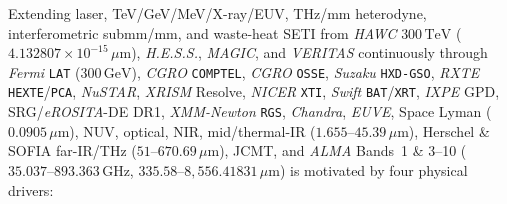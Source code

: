 \documentclass[twocolumn,10pt]{article}
\begin{document}
Extending laser, TeV/GeV/MeV/X-ray/EUV, THz/mm heterodyne, interferometric submm/mm, and waste-heat SETI from \textit{HAWC} $300\,\mathrm{TeV}$ ($4.132807\times 10^{-15}\,\mu\text{m}$), \textit{H.E.S.S.}, \textit{MAGIC}, and \textit{VERITAS} \cite{Aharonian2006,Holder2006,Aleksic2016,Abeysekara2017} continuously through \textit{Fermi} \texttt{LAT} ($300\,\mathrm{GeV}$), \textit{CGRO} \texttt{COMPTEL}, \textit{CGRO} \texttt{OSSE}, \textit{Suzaku} \texttt{HXD-GSO}, \textit{RXTE} \texttt{HEXTE}/\texttt{PCA}, \textit{NuSTAR}, \textit{XRISM} Resolve, \textit{NICER} \texttt{XTI}, \textit{Swift} \texttt{BAT}/\texttt{XRT}, \textit{IXPE} GPD, SRG/\textit{eROSITA}-DE DR1, \textit{XMM-Newton} \texttt{RGS}, \textit{Chandra}, \textit{EUVE}, Space Lyman ($0.0905\,\mu\text{m}$), NUV, optical, NIR, mid/thermal-IR ($1.655\text{--}45.39\,\mu\text{m}$), Herschel \& SOFIA far-IR/THz ($51\text{--}670.69\,\mu\text{m}$), JCMT, and \textit{ALMA} Bands~1 \& 3--10 ($35.037\text{--}893.363\,\text{GHz}$, $335.58\text{--}8{,}556.41831\,\mu\text{m}$) \cite{Townes1983,Kingsley2001,Howard2004,Maire2019,Suazo2024} is motivated by four physical drivers:
\end{document}
